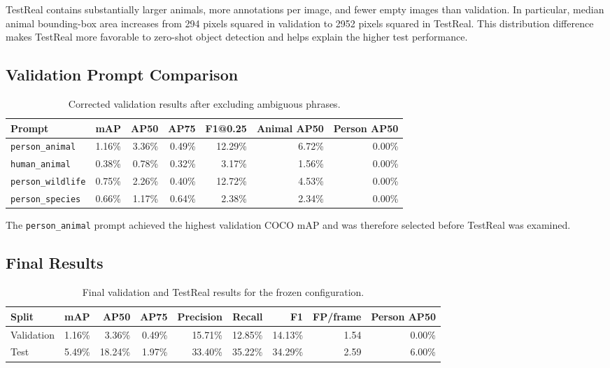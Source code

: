 TestReal contains substantially larger animals, more annotations per image, and fewer empty images than validation. In particular, median animal bounding-box area increases from 294 pixels squared in validation to 2952 pixels squared in TestReal. This distribution difference makes TestReal more favorable to zero-shot object detection and helps explain the higher test performance.

\subsection{Validation Prompt Comparison}

\begin{table}[htbp]
\centering
\caption{Corrected validation results after excluding ambiguous phrases.}
\label{tab:experiment-a-prompts}
\small
\begin{tabular}{lrrrrrr}
\hline
Prompt & mAP & AP50 & AP75 & F1@0.25 & Animal AP50 & Person AP50 \\
\hline
\texttt{person\_animal} & 1.16\% & 3.36\% & 0.49\% & 12.29\% & 6.72\% & 0.00\% \\
\texttt{human\_animal} & 0.38\% & 0.78\% & 0.32\% & 3.17\% & 1.56\% & 0.00\% \\
\texttt{person\_wildlife} & 0.75\% & 2.26\% & 0.40\% & 12.72\% & 4.53\% & 0.00\% \\
\texttt{person\_species} & 0.66\% & 1.17\% & 0.64\% & 2.38\% & 2.34\% & 0.00\% \\
\hline
\end{tabular}
\end{table}

The \texttt{person\_animal} prompt achieved the highest validation COCO mAP and was therefore selected before TestReal was examined.

\subsection{Final Results}

\begin{table}[htbp]
\centering
\caption{Final validation and TestReal results for the frozen configuration.}
\label{tab:experiment-a-final}
\small
\begin{tabular}{lrrrrrrrr}
\hline
Split & mAP & AP50 & AP75 & Precision & Recall & F1 & FP/frame & Person AP50 \\
\hline
Validation & 1.16\% & 3.36\% & 0.49\% & 15.71\% & 12.85\% & 14.13\% & 1.54 & 0.00\% \\
Test & 5.49\% & 18.24\% & 1.97\% & 33.40\% & 35.22\% & 34.29\% & 2.59 & 6.00\% \\
\hline
\end{tabular}
\end{table}

